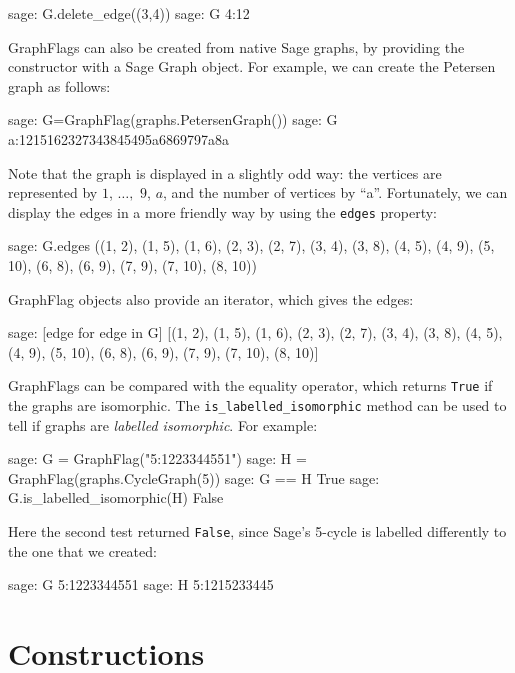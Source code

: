 \documentclass{article}
\begin{document}
\begin{sage}
sage: G.delete_edge((3,4))
sage: G
4:12
\end{sage}

GraphFlags can also be created from native Sage graphs, by providing the constructor with a Sage Graph object. For example, we can create the Petersen graph as follows:

\begin{sage}
sage: G=GraphFlag(graphs.PetersenGraph())
sage: G
a:1215162327343845495a6869797a8a
\end{sage}

Note that the graph is displayed in a slightly odd way: the vertices are represented by $1$, $\dots,$ $9$, $a$, and the number of vertices by ``a''. Fortunately, we can display the edges in a more friendly way by using the \verb|edges| property:

\begin{sage}
sage: G.edges
((1, 2), (1, 5), (1, 6), (2, 3), (2, 7), (3, 4), (3, 8), (4, 5), (4, 9),
(5, 10), (6, 8), (6, 9), (7, 9), (7, 10), (8, 10))
\end{sage}

GraphFlag objects also provide an iterator, which gives the edges:

\begin{sage}
sage: [edge for edge in G]
[(1, 2), (1, 5), (1, 6), (2, 3), (2, 7), (3, 4), (3, 8), (4, 5), (4, 9),
(5, 10), (6, 8), (6, 9), (7, 9), (7, 10), (8, 10)]
\end{sage}

GraphFlags can be compared with the equality operator, which returns \verb|True| if the graphs are isomorphic. The \verb|is_labelled_isomorphic| method can be used to tell if graphs are \emph{labelled isomorphic}. For example:

\begin{sage}
sage: G = GraphFlag("5:1223344551")
sage: H = GraphFlag(graphs.CycleGraph(5))
sage: G == H
True
sage: G.is_labelled_isomorphic(H)
False
\end{sage}

Here the second test returned \verb|False|, since Sage's 5-cycle is labelled differently to the one that we created:

\begin{sage}
sage: G
5:1223344551
sage: H
5:1215233445
\end{sage}

\section{Constructions}
\end{document}
